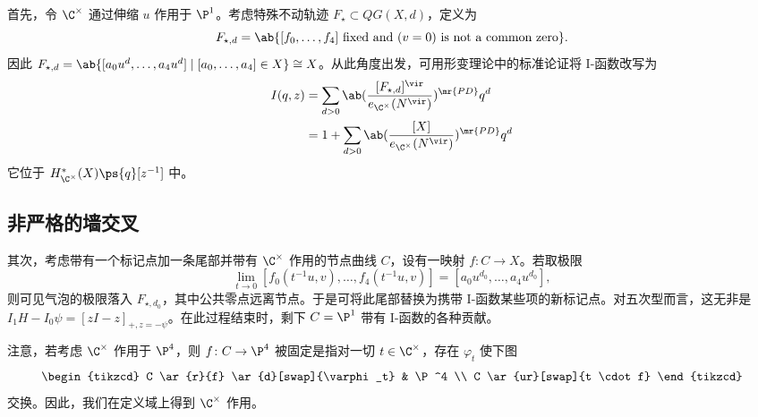 首先，令 \(\C^{\times}\) 通过伸缩 \(u\) 作用于 \(\P^1\)。考虑特殊不动轨迹 \(F_{\star} \subset QG(X, d)\)，定义为
\[ F_{\star,d} = \ab\{ [f_0, \ldots, f_4] \text{ fixed and } (v=0) \text{ is not a common zero} \}. \]
因此 \(F_{\star,d} = \ab\{ [a_0 u^d, \ldots, a_4 u^d] \mid [a_0, \ldots, a_4] \in X \} \cong X\)。从此角度出发，可用形变理论中的标准论证将 I-函数改写为
\begin{align*}
    I(q,z) &= \sum_{d > 0} \ab(\frac{[F_{\star, d}]^{\vir}}{e_{\C^{\times}}(N^{\vir})})^{\mr{PD}} q^d \\
    &= 1 + \sum_{d > 0} \ab( \frac{[X]}{e_{\C^{\times}}(N^{\vir})})^{\mr{PD}} q^d
\end{align*}
它位于 \(H^*_{\C^{\times}}(X) \ps{q}[z^{-1}]\) 中。

\subsection{非严格的墙交叉}%
\label{sub:Wall-crossing without rigor}


其次，考虑带有一个标记点加一条尾部并带有 \(\C^{\times}\) 作用的节点曲线 \(C\)，设有一映射 \(f \colon C \to X\)。若取极限
\[ \lim_{t \to 0} [f_0(t^{-1}u, v), \ldots, f_4(t^{-1}u, v)] = [a_0 u^{d_0}, \ldots, a_4 u^{d_0}], \]
则可见气泡的极限落入 \(F_{\star, d_0}\)，其中公共零点远离节点。于是可将此尾部替换为携带 I-函数某些项的新标记点。对五次型而言，这无非是 \(I_1 H - I_0 \psi = [zI-z]_{+, z = -\psi}\)。在此过程结束时，剩下 \(C = \P^1\) 带有 I-函数的各种贡献。

注意，若考虑 \(\C^{\times}\) 作用于 \(\P^4\)，则 \(f \colon C \to \P^4\) 被固定是指对一切 \(t \in \C^{\times}\)，存在 \(\varphi_t\) 使下图
\begin{equation*}
\begin{tikzcd}
    C \ar{r}{f} \ar{d}[swap]{\varphi_t} & \P^4 \\
    C \ar{ur}[swap]{t \cdot f}
\end{tikzcd}
\end{equation*}
交换。因此，我们在定义域上得到 \(\C^{\times}\) 作用。

